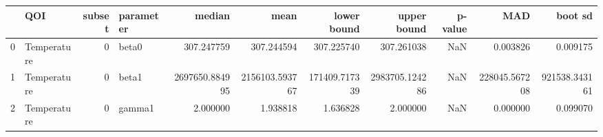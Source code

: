 \begin{tabular}{llrlrrrrrrr}
\toprule
 & QOI & subset & parameter & median & mean & lower bound & upper bound & p-value & MAD & boot sd \\
\midrule
0 & Temperature & 0 & beta0 & 307.247759 & 307.244594 & 307.225740 & 307.261038 & NaN & 0.003826 & 0.009175 \\
1 & Temperature & 0 & beta1 & 2697650.884995 & 2156103.593767 & 171409.717339 & 2983705.124286 & NaN & 228045.567208 & 921538.343161 \\
2 & Temperature & 0 & gamma1 & 2.000000 & 1.938818 & 1.636828 & 2.000000 & NaN & 0.000000 & 0.099070 \\
\bottomrule
\end{tabular}
